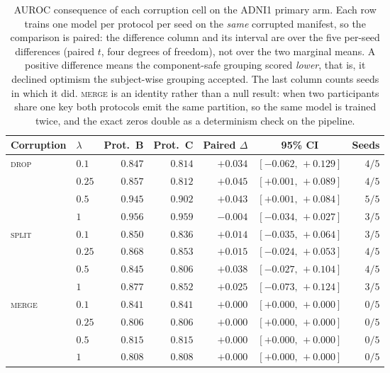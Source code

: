 \documentclass[11pt]{article}
\begin{document}
\begin{table}[!ht]
\centering
\small
\caption{AUROC consequence of each corruption cell on the ADNI1 primary
arm. Each row trains one model per protocol per seed on the \emph{same}
corrupted manifest, so the comparison is paired: the difference column
and its interval are over the five per-seed differences
(paired $t$, four degrees of freedom), not over the two marginal means.
A positive difference means the component-safe grouping scored
\emph{lower}, that is, it declined optimism the subject-wise grouping
accepted. The last column counts seeds in which it did.
\textsc{merge} is an identity rather than a null result: when two
participants share one key both protocols emit the same partition, so the
same model is trained twice, and the exact zeros double as a determinism
check on the pipeline.}
\label{sm:tab:stress_auroc}
\begin{tabular}{@{}llrrrcr@{}}
\toprule
\textbf{Corruption} & $\lambda$ & \textbf{Prot.~B} & \textbf{Prot.~C}
 & \textbf{Paired} $\Delta$ & \textbf{95\% CI} & \textbf{Seeds} \\
\midrule
\textsc{drop} & $0.1$ & $0.847$ & $0.814$ & $+0.034$ & $[-0.062,\, +0.129]$ & $4/5$ \\
 & $0.25$ & $0.857$ & $0.812$ & $+0.045$ & $[+0.001,\, +0.089]$ & $4/5$ \\
 & $0.5$ & $0.945$ & $0.902$ & $+0.043$ & $[+0.001,\, +0.084]$ & $5/5$ \\
 & $1$ & $0.956$ & $0.959$ & $-0.004$ & $[-0.034,\, +0.027]$ & $3/5$ \\
\addlinespace
\textsc{split} & $0.1$ & $0.850$ & $0.836$ & $+0.014$ & $[-0.035,\, +0.064]$ & $3/5$ \\
 & $0.25$ & $0.868$ & $0.853$ & $+0.015$ & $[-0.024,\, +0.053]$ & $4/5$ \\
 & $0.5$ & $0.845$ & $0.806$ & $+0.038$ & $[-0.027,\, +0.104]$ & $4/5$ \\
 & $1$ & $0.877$ & $0.852$ & $+0.025$ & $[-0.073,\, +0.124]$ & $3/5$ \\
\addlinespace
\textsc{merge} & $0.1$ & $0.841$ & $0.841$ & $+0.000$ & $[+0.000,\, +0.000]$ & $0/5$ \\
 & $0.25$ & $0.806$ & $0.806$ & $+0.000$ & $[+0.000,\, +0.000]$ & $0/5$ \\
 & $0.5$ & $0.815$ & $0.815$ & $+0.000$ & $[+0.000,\, +0.000]$ & $0/5$ \\
 & $1$ & $0.808$ & $0.808$ & $+0.000$ & $[+0.000,\, +0.000]$ & $0/5$ \\
\bottomrule
\end{tabular}
\end{table}
\end{document}
